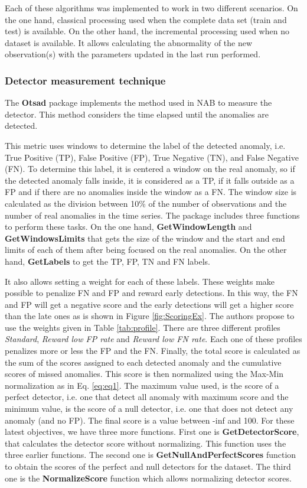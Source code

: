 \documentclass[a4paper]{article}\usepackage[]{graphicx}\usepackage[]{color}
\begin{document}
Each of these algorithms was implemented to work in two different scenarios. On the one hand, classical processing used when the complete data set (train and test) is available. On the other hand, the incremental processing used when no dataset is available. It allows calculating the abnormality of the new observation(s) with the parameters updated in the last run performed.

\subsubsection{Detector measurement technique} \label{S:3.1.2}

The \textbf{Otsad} package implements the method used in NAB \cite{7424283} to measure the detector. This method considers the time elapsed until the anomalies are detected.

This metric uses windows to determine the label of the detected anomaly, i.e. True Positive (TP), False Positive (FP), True Negative (TN), and False Negative (FN). To determine this label, it is centered a window on the real anomaly, so if the detected anomaly falls inside, it is considered as a TP, if it falls outside as a FP and if there are no anomalies inside the window as a FN.  The window size is calculated as the division between 10\% of the number of observations and the number of real anomalies in the time series. The package includes three functions to perform these tasks. On the one hand, \textbf{GetWindowLength} and \textbf{GetWindowsLimits} that gets the size of the window and the start and end limits of each of them after being focused on the real anomalies. On the other hand, \textbf{GetLabels} to get the TP, FP, TN and FN labels.


It also allows setting a weight for each of these labels. These weights make possible to penalize FN and FP and reward early detections. In this way, the FN and FP will get a negative score and the early detections will get a higher score than the late ones as is shown in Figure \ref{fig:ScoringEx}. The authors propose to use the weights given in Table \ref{tab:profile}. There are three different profiles \emph{Standard}, \emph{Reward low FP rate} and \emph{Reward low FN rate}. Each one of these profiles penalizes more or less the FP and the FN. Finally, the total score is calculated as the sum of the scores assigned to each detected anomaly and the cumulative scores of missed anomalies. This score is then normalized using the Max-Min normalization as in Eq. \ref{eq:eq1}. The maximum value used, is the score of a perfect detector, i.e. one that detect all anomaly with maximum score and the minimum value, is the score of a null detector, i.e. one that does not detect any anomaly (and no FP). The final score is a value between -inf and 100. For these latest objectives, we have three more functions. First one is \textbf{GetDetectorScore}, that calculates the detector score without normalizing. This function uses the three earlier functions. The second one is  \textbf{GetNullAndPerfectScores} function to obtain the scores of the perfect and null detectors for the dataset. The third one is the \textbf{NormalizeScore} function which allows normalizing detector scores.
\end{document}
